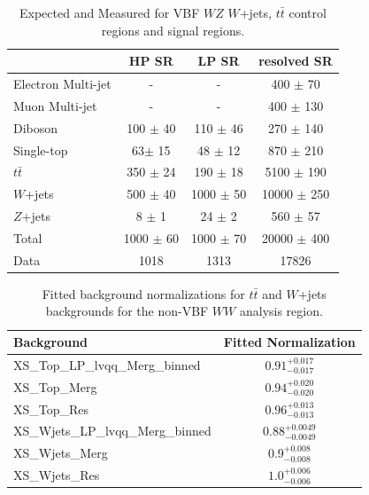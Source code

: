 \begin{table}
\begin{tabular}{|l|c|c|c|}
\hline
	  &	 HP SR &	 LP SR &	resolved SR \\\hline 
	Electron Multi-jet &	- &	- &	400 $\pm$ 70\\\hline 
	Muon Multi-jet &	- &	- &	400 $\pm$ 130 \\\hline 
	Diboson &	100 $\pm$ 40 &	110 $\pm$ 46 &	270 $\pm$ 140 \\\hline 
	Single-top &	63$\pm$ 15&	48 $\pm$ 12 &	870 $\pm$ 210 \\\hline 
	$t\bar{t}$ &	350 $\pm$ 24 &	190 $\pm$ 18 &	5100 $\pm$ 190 \\\hline 
	$W$+jets &	500 $\pm$ 40 &	1000 $\pm$ 50 &	10000 $\pm$ 250 \\\hline 
	$Z$+jets &	8 $\pm$ 1 &	24 $\pm$ 2 &	560 $\pm$ 57 \\\hline 
	Total &	1000 $\pm$ 60 &	1000 $\pm$ 70 &	20000 $\pm$ 400 \\\hline 
	Data &	1018 &	1313 &	17826 \\\hline 
\end{tabular}
\caption{Expected and Measured for VBF $WZ$ $W$+jets, $t\bar{t}$ control regions and signal regions.}
\label{tbl:hvwzvbf_yields}

\end{table}

\begin{table}
\begin{tabular}{|l|c|}
\hline
Background & Fitted Normalization \\\hline
XS\_Top\_LP\_lvqq\_Merg\_binned & $0.91^{+0.017}_{-0.017}$ \\\hline
XS\_Top\_Merg & $0.94^{+0.020}_{-0.020}$ \\\hline
XS\_Top\_Res & $0.96^{+0.013}_{-0.013}$ \\\hline
XS\_Wjets\_LP\_lvqq\_Merg\_binned & $0.88^{+0.0049}_{-0.0049}$ \\\hline
XS\_Wjets\_Merg & $0.9^{+0.008}_{-0.008}$ \\\hline
XS\_Wjets\_Res & $1.0^{+0.006}_{-0.006}$ \\\hline

\end{tabular}
\caption{Fitted background normalizations for $t\bar{t}$ and $W$+jets backgrounds for the non-VBF $WW$ analysis region.}
\label{tbl:hvtww_norm}
\end{table}



